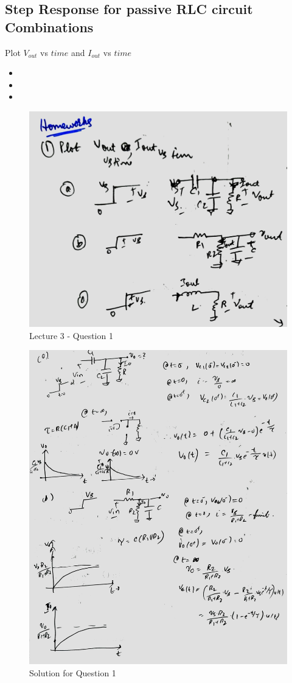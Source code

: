 \documentclass[a4paper]{article}
\begin{document}
\subsection{Step Response for passive RLC circuit Combinations}
Plot $V_{out}$ vs $time$ and $I_{out}$ vs $time$
\begin{itemize}
    \item 
    \item 
    \item 
\end{itemize}
\begin{figure}
    \centering
    \includegraphics[width=0.8\linewidth]{images/Lec_3_Q_1.jpeg}
    \caption{Lecture 3 - Question 1}
\end{figure}

\begin{figure}
    \centering
    \includegraphics[width=1\linewidth]{images/Lec_3_Q1_Soln_1.jpeg}
    \caption{Solution for Question 1}
\end{figure}
\end{document}
